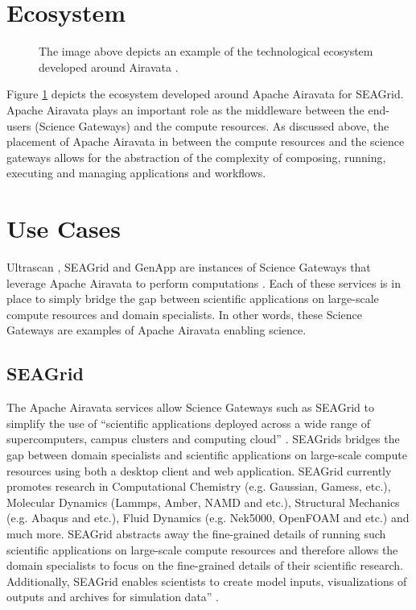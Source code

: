 \documentclass[9pt,twocolumn,twoside]{styles/osajnl}
\begin{document}
\section{Ecosystem} \label{ecosystem}
\begin{figure}[htbp]
\centering
{}
\caption{The image above depicts an example of the technological
  ecosystem developed around Airavata \cite{www-airavata-ecosystem}.}
\label{fig:airavata-ecosystem}
\end{figure}
Figure \ref{fig:airavata-ecosystem} depicts the ecosystem developed
around Apache Airavata for SEAGrid. Apache Airavata plays an important role as the
middleware between the end-users (Science Gateways) and the compute
resources. As discussed above, the placement of Apache Airavata in
between the compute resources and the science gateways allows for the
abstraction of the complexity of composing, running, executing and
managing applications and workflows.

\section{Use Cases} \label{use}
Ultrascan \cite{www-ultrascan}, SEAGrid \cite{www-seagrid} and GenApp
\cite{www-genapp} are instances of Science Gateways that leverage
Apache Airavata to perform computations \cite{www-airavata}. Each of
these services is in place to simply bridge the gap between
scientific applications on large-scale compute resources and domain
specialists. In other words, these Science Gateways are examples of
Apache Airavata enabling science.

\subsection{SEAGrid} \label{seagrid}
The Apache Airavata services allow Science Gateways such as SEAGrid to
simplify the use of ``scientific applications deployed across a wide
range of supercomputers, campus clusters and computing cloud''
\cite{www-seagrid}. SEAGrids bridges the gap between domain
specialists and scientific applications on large-scale compute
resources using both a desktop client and web application. SEAGrid
currently promotes research in Computational Chemistry (e.g. Gaussian,
Gamess, etc.), Molecular Dynamics (Lammps, Amber, NAMD and etc.),
Structural Mechanics (e.g. Abaqus and etc.), Fluid Dynamics
(e.g. Nek5000, OpenFOAM and etc.) and much more. SEAGrid abstracts
away the fine-grained details of running such scientific applications
on large-scale compute resources and therefore allows the domain
specialists to focus on the fine-grained details of their scientific
research. Additionally, SEAGrid enables scientists to create model
inputs, visualizations of outputs and archives for simulation data''
\cite{www-seagrid}.
\end{document}
